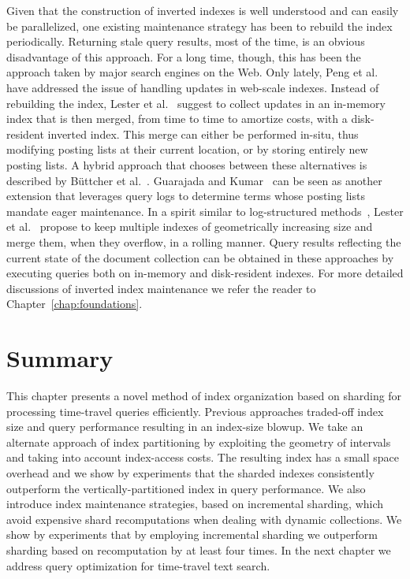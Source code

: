 Given that the construction of inverted indexes is well understood and
can easily be parallelized, one existing maintenance strategy has been
to rebuild the index periodically. Returning stale query results, most
of the time, is an obvious disadvantage of this approach. For a long
time, though, this has been the approach taken by major search engines
on the Web. Only lately, Peng et al.~\cite{Peng:2010fk} have addressed
the issue of handling updates in web-scale indexes. Instead of
rebuilding the index, Lester et al.~\cite{lester2006efficient} suggest to
collect updates in an in-memory index that is then merged, from time
to time to amortize costs, with a disk-resident inverted index. This
merge can either be performed in-situ, thus modifying posting lists at
their current location, or by storing entirely new posting lists. A
hybrid approach that chooses between these alternatives is described
by B\"uttcher et al.~\cite{Buttcher:2008fk}. Guarajada and
Kumar~\cite{Gurajada:2009vn} can be seen as another extension that
leverages query logs to determine terms whose posting lists mandate
eager maintenance. In a spirit similar to log-structured
methods~\cite{ONeil:1996fk}, Lester et al.~\cite{Lester:2008qf}
propose to keep multiple indexes of geometrically increasing size and
merge them, when they overflow, in a rolling manner. Query results
reflecting the current state of the document collection can be
obtained in these approaches by executing queries both on in-memory
and disk-resident indexes. For more detailed discussions of inverted
index maintenance we refer the reader to Chapter~\ref{chap:foundations}.

\section{Summary}
\label{chap:sharding:sec:summary}

This chapter presents a novel method of index organization based on
sharding for processing time-travel queries efficiently. Previous approaches traded-off index size and query performance resulting in an index-size blowup. We take an alternate approach of index partitioning by exploiting the geometry of intervals and taking into account index-access costs. The resulting index has a small space overhead and we show by experiments that the sharded indexes consistently outperform the vertically-partitioned index in query performance. We also introduce index maintenance strategies, based on incremental sharding, which avoid expensive shard recomputations when dealing with dynamic collections. We show by experiments that by employing incremental sharding we outperform sharding based on recomputation by  at least four times. In the next chapter we address query optimization for time-travel text search. 